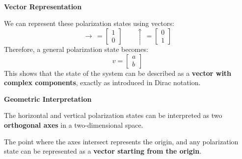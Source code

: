 \begin{examplebox}
    \highspace
    \begin{flushleft}
        \textcolor{Green3}{ \textbf{Vector Representation}}
    \end{flushleft}
    We can represent these polarization states using vectors:
    \begin{equation*}
        \rightarrow \, =
        \begin{bmatrix}
            1 \\
            0
        \end{bmatrix}
        \hspace{2em}
        \uparrow \, =
        \begin{bmatrix}
            0 \\
            1
        \end{bmatrix}
    \end{equation*}
    Therefore, a general polarization state becomes:
    \begin{equation*}
        v =
        \begin{bmatrix}
            a \\
            b
        \end{bmatrix}
    \end{equation*}
    This shows that the state of the system can be described as a \textbf{vector with complex components}, exactly as introduced in Dirac notation.

    \highspace
    \begin{flushleft}
        \textcolor{Green3}{ \textbf{Geometric Interpretation}}
    \end{flushleft}
    The horizontal and vertical polarization states can be interpreted as two \textbf{orthogonal axes} in a two-dimensional space.

    \begin{center}
    \end{center}
    The point where the axes intersect represents the origin, and any polarization state can be represented as a \textbf{vector starting from the origin}.


\end{examplebox}
